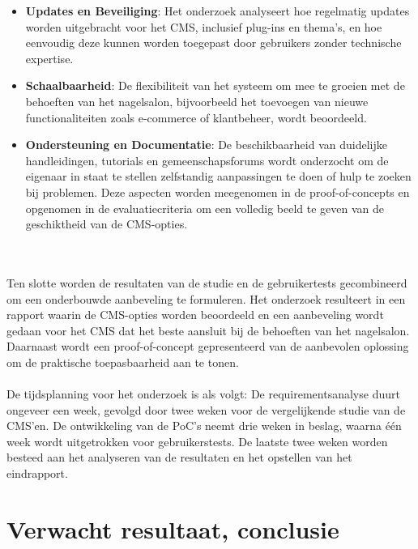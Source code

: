 \begin{itemize}
    \item \textbf{Updates en Beveiliging}: Het onderzoek analyseert hoe regelmatig updates worden uitgebracht voor het CMS, inclusief plug-ins en thema’s, en hoe eenvoudig deze kunnen worden toegepast door gebruikers zonder technische expertise.
    \item \textbf{Schaalbaarheid}: De flexibiliteit van het systeem om mee te groeien met de behoeften van het nagelsalon, bijvoorbeeld het toevoegen van nieuwe functionaliteiten zoals e-commerce of klantbeheer, wordt beoordeeld.
    \item \textbf{Ondersteuning en Documentatie}: De beschikbaarheid van duidelijke handleidingen, tutorials en gemeenschapsforums wordt onderzocht om de eigenaar in staat te stellen zelfstandig aanpassingen te doen of hulp te zoeken bij problemen.
    Deze aspecten worden meegenomen in de proof-of-concepts en opgenomen in de evaluatiecriteria om een volledig beeld te geven van de geschiktheid van de CMS-opties.
\end{itemize}
\\ \\
Ten slotte worden de resultaten van de studie en de gebruikertests gecombineerd om een onderbouwde aanbeveling te formuleren. Het onderzoek resulteert in een rapport waarin de CMS-opties worden beoordeeld en een aanbeveling wordt gedaan voor het CMS dat het beste aansluit bij de behoeften van het nagelsalon. Daarnaast wordt een proof-of-concept gepresenteerd van de aanbevolen oplossing om de praktische toepasbaarheid aan te tonen.
\\ \\
De tijdsplanning voor het onderzoek is als volgt:
De requirementsanalyse duurt ongeveer een week, gevolgd door twee weken voor de vergelijkende studie van de CMS’en. De ontwikkeling van de PoC’s neemt drie weken in beslag, waarna één week wordt uitgetrokken voor gebruikerstests. De laatste twee weken worden besteed aan het analyseren van de resultaten en het opstellen van het eindrapport.



\section{Verwacht resultaat, conclusie}%
\label{sec:verwachte_resultaten}

